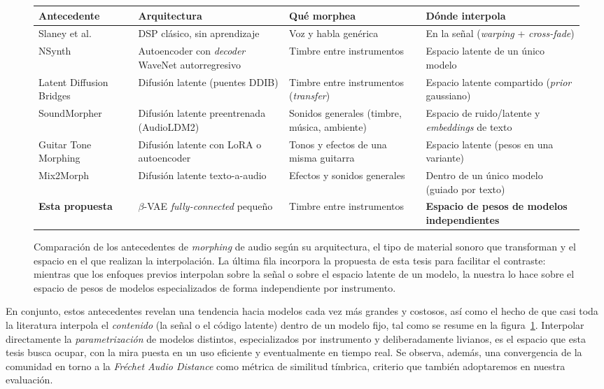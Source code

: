 \documentclass[12pt,a4paper,twoside]{tesis}
\begin{document}
\begin{figure}[H]
\centering
\footnotesize
\begin{tabular}{|p{2.8cm}|p{3.3cm}|p{3.0cm}|p{3.5cm}|}
\hline
\textbf{Antecedente} & \textbf{Arquitectura} & \textbf{Qué morphea} & \textbf{Dónde interpola} \\
\hline
Slaney et al.~\cite{slaney1996audiomorphing} & DSP clásico, sin aprendizaje & Voz y habla genérica & En la señal (\textit{warping} + \textit{cross-fade}) \\
\hline
NSynth~\cite{engel2017nsynth} & Autoencoder con \textit{decoder} WaveNet autorregresivo & Timbre entre instrumentos & Espacio latente de un único modelo \\
\hline
Latent Diffusion Bridges~\cite{mancusi2025latentbridges} & Difusión latente (puentes DDIB) & Timbre entre instrumentos (\textit{transfer}) & Espacio latente compartido (\textit{prior} gaussiano) \\
\hline
SoundMorpher~\cite{niu2024soundmorpher} & Difusión latente preentrenada (AudioLDM2) & Sonidos generales (timbre, música, ambiente) & Espacio de ruido/latente y \textit{embeddings} de texto \\
\hline
Guitar Tone Morphing~\cite{chen2025guitartonemorphing} & Difusión latente con LoRA o autoencoder & Tonos y efectos de una misma guitarra & Espacio latente (pesos en una variante) \\
\hline
Mix2Morph~\cite{chu2026mix2morph} & Difusión latente texto-a-audio & Efectos y sonidos generales & Dentro de un único modelo (guiado por texto) \\
\hline
\textbf{Esta propuesta} & $\beta$-VAE \textit{fully-connected} pequeño & Timbre entre instrumentos & \textbf{Espacio de pesos de modelos independientes} \\
\hline
\end{tabular}
\caption{Comparación de los antecedentes de \emph{morphing} de audio según su arquitectura, el tipo de material sonoro que transforman y el espacio en el que realizan la interpolación. La última fila incorpora la propuesta de esta tesis para facilitar el contraste: mientras que los enfoques previos interpolan sobre la señal o sobre el espacio latente de un modelo, la nuestra lo hace sobre el espacio de pesos de modelos especializados de forma independiente por instrumento.}
\label{fig:comparacion_antecedentes}
\end{figure}

En conjunto, estos antecedentes revelan una tendencia hacia modelos cada vez más grandes y costosos, así como el hecho de que casi toda la literatura interpola el \emph{contenido} (la señal o el código latente) dentro de un modelo fijo, tal como se resume en la figura~\ref{fig:comparacion_antecedentes}. Interpolar directamente la \emph{parametrización} de modelos distintos, especializados por instrumento y deliberadamente livianos, es el espacio que esta tesis busca ocupar, con la mira puesta en un uso eficiente y eventualmente en tiempo real. Se observa, además, una convergencia de la comunidad en torno a la \textit{Fréchet Audio Distance} como métrica de similitud tímbrica, criterio que también adoptaremos en nuestra evaluación.
\end{document}
